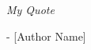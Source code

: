 \begin{center}
    \textit{My Quote}
\end{center}
\begin{flushright}
- [Author Name]
\end{flushright}
\restoregeometry